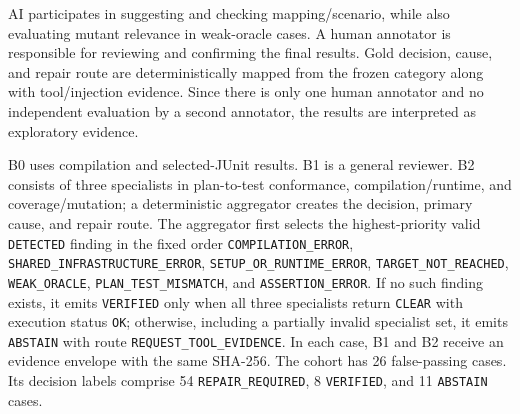 \documentclass[pdflatex,sn-basic,Numbered,iicol]{sn-jnl}
\begin{document}
AI participates in suggesting and checking mapping/scenario, while also evaluating mutant relevance in weak-oracle cases. A human annotator is responsible for reviewing and confirming the final results. Gold decision, cause, and repair route are deterministically mapped from the frozen category along with tool/injection evidence. Since there is only one human annotator and no independent evaluation by a second annotator, the results are interpreted as exploratory evidence.

B0 uses compilation and selected-JUnit results. B1 is a general reviewer. B2 consists of three specialists in plan-to-test conformance, compilation/runtime, and coverage/mutation; a deterministic aggregator creates the decision, primary cause, and repair route. The aggregator first selects the highest-priority valid \texttt{DETECTED} finding in the fixed order \texttt{COMPILATION\_ERROR}, \texttt{SHARED\_INFRASTRUCTURE\_ERROR}, \texttt{SETUP\_OR\_RUNTIME\_ERROR}, \texttt{TARGET\_NOT\_REACHED}, \texttt{WEAK\_ORACLE}, \texttt{PLAN\_TEST\_MISMATCH}, and \texttt{ASSERTION\_ERROR}. If no such finding exists, it emits \texttt{VERIFIED} only when all three specialists return \texttt{CLEAR} with execution status \texttt{OK}; otherwise, including a partially invalid specialist set, it emits \texttt{ABSTAIN} with route \texttt{REQUEST\_TOOL\_EVIDENCE}. In each case, B1 and B2 receive an evidence envelope with the same SHA-256. The cohort has 26 false-passing cases. Its decision labels comprise 54 \texttt{REPAIR\_REQUIRED}, 8 \texttt{VERIFIED}, and 11 \texttt{ABSTAIN} cases.
\end{document}
